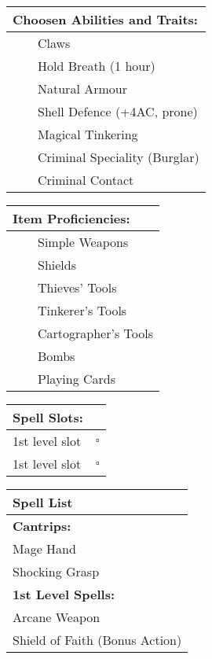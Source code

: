 \documentclass[11pt]{article}
\newcommand{\available}{$\square$}
\newcommand{\tabitem}{~~\llap{--}~~}
\begin{document}
\begin{multicols}{2}
\vspace{4mm}

\noindent \begin{tabularx}{95mm}{@{}l}
{\Large \textbf{Choosen Abilities and Traits:}} \\
\hline
\tabitem Claws \\
\tabitem Hold Breath (1 hour) \\
\tabitem Natural Armour \\
\tabitem Shell Defence (+4AC, prone) \\
\tabitem Magical Tinkering \\
\tabitem Criminal Speciality (Burglar) \\
\tabitem Criminal Contact
		\end{tabularx}

\vspace{4mm}

\noindent \begin{tabularx}{95mm}{@{}l}
{\Large \textbf{Item Proficiencies:}} \\
\hline
\tabitem Simple Weapons \\
\tabitem Shields \\
\tabitem Thieves' Tools \\
\tabitem Tinkerer's Tools \\
\tabitem Cartographer's Tools \\
\tabitem Bombs \\
\tabitem Playing Cards
		\end{tabularx}

\vspace{4mm}

\noindent \begin{tabularx}{95mm}{@{}l c}
{\Large \textbf{Spell Slots:}} & \\
\hline
1st level slot & \available \\
1st level slot & \available \\
		\end{tabularx}

\vspace{4mm}

\noindent \begin{tabularx}{95mm}{@{}l}
{\Large \textbf{Spell List}} 			\\
\hline
\textbf{Cantrips:}			 			\\
Mage Hand 							 	\\
Shocking Grasp							\\
\textbf{1st Level Spells:}	 			\\
Arcane Weapon 							\\
Shield of Faith (Bonus Action)
		\end{tabularx}
	\end{multicols}
\end{document}
